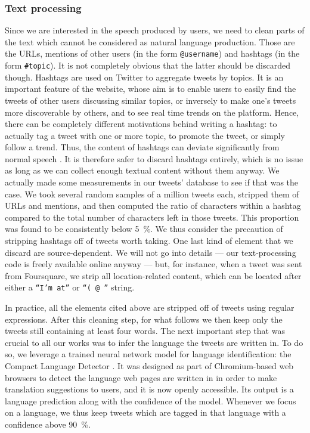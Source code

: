\documentclass[../thesis.tex]{subfiles}
\begin{document}
\subsubsection{Text processing}
\label{sec:method_text_process}
Since we are interested in the speech produced by users, we need to clean parts of the
text which cannot be considered as natural language production. Those are the URLs,
mentions of other users (in the form \texttt{@username}) and hashtags (in the form
\texttt{\#topic}). It is not completely obvious that the latter should be discarded
though. Hashtags are used on Twitter to aggregate tweets by topics. It is an important
feature of the website, whose aim is to enable users to easily find the tweets of other
users discussing similar topics, or inversely to make one's tweets more discoverable by
others, and to see real time trends on the platform. Hence, there can be completely
different motivations behind writing a hashtag: to actually tag a tweet with one or more
topic, to promote the tweet, or simply follow a trend. Thus, the content of hashtags can
deviate significantly from normal speech \cite{PageLinguisticsSelfbranding2012}. It is
therefore safer to discard hashtags entirely, which is no issue as long as we can
collect enough textual content without them anyway. We actually made some measurements
in our tweets' database to see if that was the case. We took several random samples of a
million tweets each, stripped them of URLs and mentions, and then computed the ratio of
characters within a hashtag compared to the total number of characters left in those
tweets. This proportion was found to be consistently below \SI{5}{\percent}. We thus
consider the precaution of stripping hashtags off of tweets worth taking. One last kind
of element that we discard are source-dependent. We will not go into details --- our
text-processing code is freely available online anyway \cite{LoufWordsuse2023} --- but,
for instance, when a tweet was sent from Foursquare, we strip all location-related
content, which can be located after either a \texttt{``I'm at''} or \texttt{``( @ ''}
string.

In practice, all the elements cited above are stripped off of tweets using regular
expressions. After this cleaning step, for what follows we then keep only the tweets
still containing at least four words. The next important step that was crucial to all
our works was to infer the language the tweets are written in. To do so, we leverage a
trained neural network model for language identification: the Compact Language Detector
\cite{SalcianuCompactLanguage2023a}. It was designed as part of Chromium-based web
browsers to detect the language web pages are written in in order to make translation
suggestions to users, and it is now openly accessible. Its output is a language
prediction along with the confidence of the model. Whenever we focus on a language, we
thus keep tweets which are tagged in that language with a confidence above
\SI{90}{\percent}.
\end{document}
